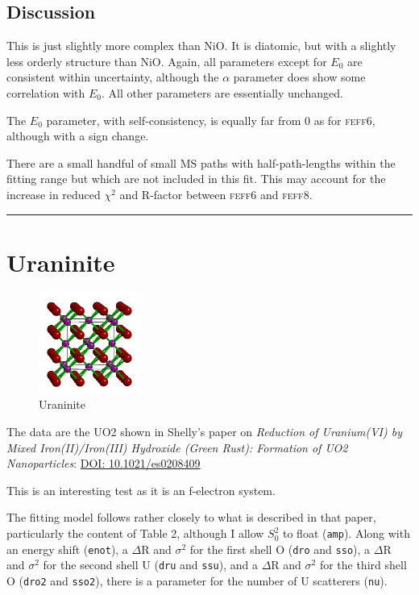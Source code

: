 \documentclass[11pt]{article}
\begin{document}
\subsection{Discussion}
\label{sec:orgheadline18}

This is just slightly more complex than NiO. It is diatomic, but with
a slightly less orderly structure than NiO. Again, all parameters
except for $E_0$ are consistent within uncertainty, although the $\alpha$
parameter does show some correlation with $E_0$. All other parameters are
essentially unchanged.

The $E_0$ parameter, with self-consistency, is equally far from 0 as for
\textsc{feff6}, although with a sign change.

There are a small handful of small MS paths with half-path-lengths
within the fitting range but which are not included in this fit. This
may account for the increase in reduced $\chi^2$ and R-factor between
\textsc{feff6} and \textsc{feff8}.

\rule{\linewidth}{0.5pt}

\section{Uraninite}
\label{sec:orgheadline25}

\begin{figure}
  \begin{center}
    \includegraphics[width=0.3\textwidth]{UO2/UO2.png}
  \end{center}
  \caption{Uraninite}
\end{figure}


The data are the UO2 shown in Shelly's paper on \textit{Reduction of
  Uranium(VI) by Mixed Iron(II)/Iron(III) Hydroxide (Green Rust):
  Formation of UO2 Nanoparticles}:
\href{http://dx.doi.org/10.1021/es0208409}{DOI: 10.1021/es0208409}

This is an interesting test as it is an f-electron system.

The fitting model follows rather closely to what is described in that
paper, particularly the content of Table 2, although I allow $S_0^2$
to float (\texttt{amp}). Along with an energy shift (\texttt{enot}), a
$\Delta$R and $\sigma^2$ for the first shell O (\texttt{dro} and
\texttt{sso}), a $\Delta$R and $\sigma^2$ for the second shell U
(\texttt{dru} and \texttt{ssu}), and a $\Delta$R and $\sigma^2$ for
the third shell O (\texttt{dro2} and \texttt{sso2}), there is a
parameter for the number of U scatterers (\texttt{nu}).
\end{document}
